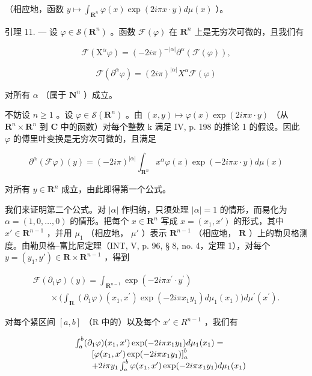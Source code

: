 （相应地，函数 \(y \mapsto \int_{\mathbf{R}^n} \varphi(x) \exp(2i\pi x \cdot y) d\mu(x)\) ）。

引理 11. --- 设 \(\varphi\in\mathcal{S}(\mathbf{R}^{n})\) 。函数 \(\mathcal{F}(\varphi)\) 在 \(\mathbf{R}^{n}\) 上是无穷次可微的，且我们有

\[
\mathcal {F} (\mathrm{X} ^ {\alpha} \varphi) = (- 2 i \pi) ^ {- | \alpha |} \partial^ {\alpha} (\mathcal {F} (\varphi)),
\]

\[
\mathcal {F} (\partial^ {\alpha} \varphi) = (2 i \pi) ^ {| \alpha |} X ^ {\alpha} \mathcal {F} (\varphi)
\]

对所有 \(\alpha\) （属于 \(\mathbf{N}^n\) ）成立。

不妨设 \(n \geqslant 1\) 。设 \(\varphi \in \mathcal{S}(\mathbf{R}^{n})\) 。由 \((x, y) \mapsto \varphi(x) \exp(2i\pi x \cdot y)\) （从 \(\mathbf{R}^{n} \times \mathbf{R}^{n}\) 到 \(\mathbf{C}\) 中的函数）对每个整数 k 满足 IV, p. 198 的推论 1 的假设。因此 \(\varphi\) 的傅里叶变换是无穷次可微的，且满足

\[
\partial^ {\alpha} (\mathcal {F} \varphi) (y) = (- 2 i \pi) ^ {| \alpha |} \int_ {\mathbf {R} ^ {n}} x ^ {\alpha} \varphi (x) \exp (- 2 i \pi x \cdot y) d \mu (x)
\]

对所有 \(y \in \mathbf{R}^{n}\) 成立，由此即得第一个公式。

我们来证明第二个公式。对 \(|\alpha|\) 作归纳，只须处理 \(|\alpha| = 1\) 的情形，而易化为 \(\alpha = (1,0,\ldots,0)\) 的情形。把每个 \(x \in \mathbf{R}^n\) 写成 \(x = (x_1,x')\) 的形式，其中 \(x' \in \mathbf{R}^{n-1}\) ，并用 \(\mu_1\) （相应地， \(\mu'\) ）表示 \(\mathbf{R}^{n-1}\) （相应地， \(\mathbf{R}\) ）上的勒贝格测度。由勒贝格–富比尼定理（INT, V, p. 96, § 8, no. 4，定理 1），对每个 \(y = (y_1,y') \in \mathbf{R} \times \mathbf{R}^{n-1}\) ，得到

\[
\begin{array}{l} \mathcal {F} (\partial_ {1} \varphi) (y) = \int_ {\mathbf {R} ^ {n - 1}} \exp (- 2 i \pi   x ^ {\prime} \cdot y ^ {\prime}) \\ \qquad \times \Big (\int_ {\mathbf {R}} (\partial_ {1} \varphi) (x _ {1}, x ^ {\prime}) \exp (- 2 i \pi   x _ {1} y _ {1}) d \mu_ {1} (x _ {1}) \Big) d \mu^ {\prime} (x ^ {\prime}). \end{array}
\]

对每个紧区间 \([a,b]\) （R 中的）以及每个 \(x'\in R^{n-1}\) ，我们有

\[
\begin{array}{r l} & {\int_ {a} ^ {b} (\partial_ {1} \varphi) (x _ {1}, x ^ {\prime}) \exp (- 2 i \pi x _ {1} y _ {1}) d \mu_ {1} (x _ {1}) =} \\ & {\qquad \left[ \varphi (x _ {1}, x ^ {\prime}) \exp (- 2 i \pi x _ {1} y _ {1}) \right] _ {a} ^ {b}} \\ & {\qquad + 2 i \pi y _ {1} \int_ {a} ^ {b} \varphi (x _ {1}, x ^ {\prime}) \exp (- 2 i \pi x _ {1} y _ {1}) d \mu_ {1} (x _ {1})} \end{array}
\]

